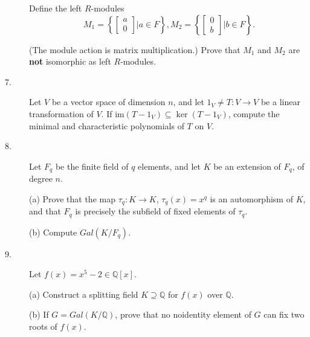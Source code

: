 \documentclass{article}
\def\Q{\mathbb Q}
\begin{document}
\begin{description}
Define the left $R$-modules
$$M_1 = \left\{\begin{bmatrix} a \\ 0 \end{bmatrix} | a \in F \right\},
  M_2 = \left\{\begin{bmatrix} 0 \\ b \end{bmatrix} | b \in F \right\}.$$

(The module action is matrix multiplication.) Prove that $M_1$ and
$M_2$ are {\bf not} isomorphic as left $R$-modules.

\item[7.]
Let $V$ be a vector space of dimension $n$, and let
$1_V \neq T:V \to V$ be a linear transformation of $V$.
If im$(T-1_V) \subseteq \ker (T-1_V)$, compute the minimal and characteristic
polynomials of $T$ on $V$.

\item[8.]
Let $F_q$ be the finite field of $q$ elements, and let $K$ be an extension
of $F_q$, of degree $n$.

\item[\quad] (a)
Prove that the map $\tau_q : K \to K$, $\tau_q(x) = x^q$
is an automorphism of $K$, and that $F_q$ is precisely the subfield of fixed
elements of $\tau_q$.

\item[\quad] (b)
Compute $Gal(K/F_q)$.

\item[9.]
Let $f(x) = x^5 - 2 \in \Q[x]$.

\item[\quad] (a)
Construct a splitting field $K \supseteq \Q$ for $f(x)$ over $\Q$.

\item[\quad] (b)
If $G=Gal(K/\Q)$, prove that no noidentity element of $G$ can fix
two roots of $f(x)$.







\end{description}    
\end{document}
